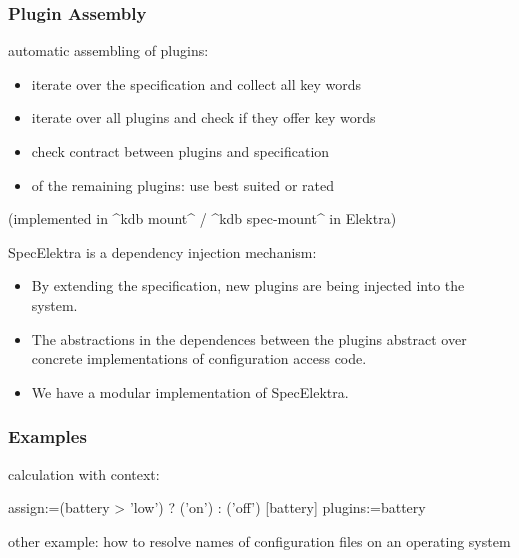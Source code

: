 \begin{frame}[fragile]
	\frametitle{Plugin Assembly}

	automatic assembling of plugins:

	\begin{itemize}[<+->]
	\item iterate over the specification and collect all key words
	\item iterate over all plugins and check if they offer key words
	\item check contract between plugins and specification
	\item of the remaining plugins: use best suited or rated
	\end{itemize}

	\vspace{1cm}

	\pause[\thebeamerpauses]

	(implemented in ^kdb mount^ / ^kdb spec-mount^ in Elektra)
\end{frame}

\begin{frame}
	SpecElektra is a dependency injection mechanism:

	\begin{itemize}[<+->]
	\item By extending the specification, new plugins are being injected into the system.
	\item The  abstractions in the dependences between the plugins abstract over concrete implementations of configuration access code.
	\item We have a modular implementation of SpecElektra.
	\end{itemize}


\end{frame}

\begin{frame}[fragile]
	\frametitle{Examples}
	calculation with context:
	\begin{code}
	assign:=(battery > 'low') ? ('on') : ('off')
	[battery]
	plugins:=battery
	\end{code}

	\pause
	\vspace{1cm}

	other example: how to resolve names of configuration files on an operating system
\end{frame}


